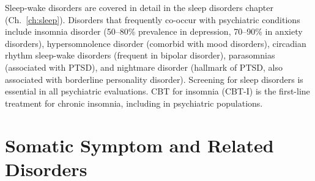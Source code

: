 

\label{sec:Sleep-Wake Disorders}

Sleep-wake disorders are covered in detail in the sleep disorders chapter (Ch.~\ref{ch:sleep}). Disorders that frequently co-occur with psychiatric conditions include insomnia disorder (50--80\% prevalence in depression, 70--90\% in anxiety disorders), hypersomnolence disorder (comorbid with mood disorders), circadian rhythm sleep-wake disorders (frequent in bipolar disorder), parasomnias (associated with PTSD), and nightmare disorder (hallmark of PTSD, also associated with borderline personality disorder). Screening for sleep disorders is essential in all psychiatric evaluations. CBT for insomnia (CBT-I) is the first-line treatment for chronic insomnia, including in psychiatric populations.

\section{Somatic Symptom and Related Disorders}








\label{sec:Somatic Symptom and Related Disorders}

